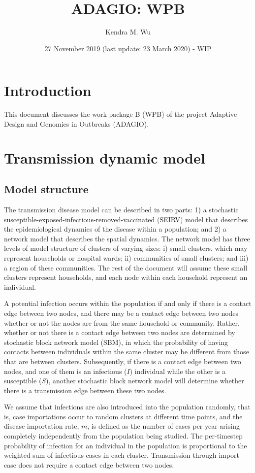 \documentclass[a4paper]{article}
\title{ADAGIO: WPB}
\author{Kendra M. Wu}
\date{27 November 2019 (last update: 23 March 2020) - WIP}
\begin{document}
	\maketitle
	
	\section{Introduction}
	This document discusses the work package B (WPB) of the project Adaptive Design and Genomics in Outbreaks (ADAGIO).
	
	\section{Transmission dynamic model}
	\label{sec:TransModel}
	\subsection{Model structure}
	The transmission disease model can be described in two parts: 1) a stochastic susceptible-exposed-infectious-removed-vaccinated (SEIRV) model that describes the epidemiological dynamics of the disease within a population; and 2) a network model that describes the spatial dynamics. The network model has three levels of model structure of clusters of varying sizes: i) small clusters, which may represent households or hospital wards; ii) communities of small clusters; and iii) a region of these communities. The rest of the document will assume these small clusters represent households, and each node within each household represent an individual. 
	
	A potential infection occurs within the population if and only if there is a contact edge between two nodes, and there may be a contact edge between two nodes whether or not the nodes are from the same household or community. Rather, whether or not there is a contact edge between two nodes are determined by stochastic block network model (SBM), in which the probability of having contacts between individuals within the same cluster may be different from those that are between clusters. Subsequently, if there is a contact edge between two nodes, and one of them is an infectious ($I$) individual while the other is a susceptible ($S$), another stochastic block network model will determine whether there is a transmission edge between these two nodes. 
	
	We assume that infections are also introduced into the population randomly, that is, case importations occur to random clusters at different time points, and the disease importation rate, $m$, is defined as the number of cases per year arising completely independently from the population being studied. The per-timestep probability of infection for an individual in the population is proportional to the weighted sum of infectious cases in each cluster. Transmission through import case does not require a contact edge between two nodes.
	
\end{document}
